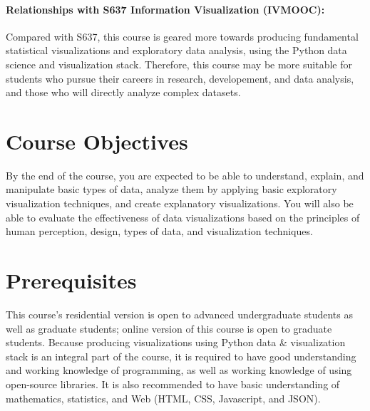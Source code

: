\documentclass[11pt,article,oneside]{memoir} %
\begin{document}
\paragraph{Relationships with S637 Information Visualization (IVMOOC):}
Compared with S637, this course is geared more towards producing fundamental statistical visualizations and exploratory data analysis, using the Python data science and visualization stack.  
Therefore, this course may be more suitable for students who pursue their careers in research, developement, and data analysis, and those who will directly analyze complex datasets. 

\section{Course Objectives}%

By the end of the course, you are expected to be able to understand, explain, and manipulate basic types of data, analyze them by applying basic exploratory visualization techniques, and create explanatory visualizations. 
You will also be able to evaluate the effectiveness of data visualizations based on the principles of human perception, design, types of data, and visualization techniques. 
 


\section{Prerequisites}%
\label{sec:Prerequisites}

This course's residential version is open to advanced undergraduate students as well as graduate students; online version of this course is open to graduate students. 
Because producing visualizations using Python data \& visualization stack is an integral part of the course, it is required to have good understanding and working knowledge of programming, as well as working knowledge of using open-source libraries. 
It is also recommended to have basic understanding of mathematics, statistics, and Web (HTML, CSS, Javascript, and JSON). 
\end{document}
